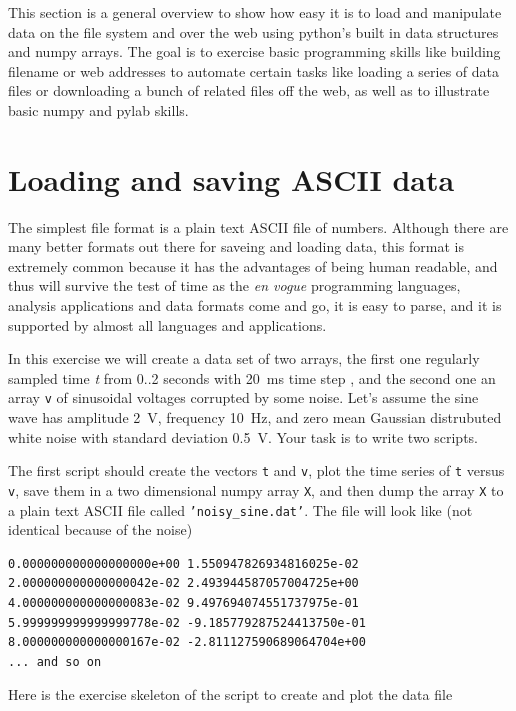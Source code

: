 This section is a general overview to show how easy it is to load
and manipulate data on the file system and over the web using python's
built in data structures and numpy arrays.  The goal is to exercise
basic programming skills like building filename or web addresses to
automate certain tasks like loading a series of data files or
downloading a bunch of related files off the web, as well as to
illustrate basic numpy and pylab skills.

\section{Loading and saving ASCII data}
\label{sec:ascii_data}

The simplest file format is a plain text ASCII file of numbers.
Although there are many better formats out there for saveing and
loading data, this format is extremely common because it has the
advantages of being human readable, and thus will survive the test of
time as the \textit{en vogue} programming languages, analysis
applications and data formats come and go, it is easy to parse, and it
is supported by almost all languages and applications.  

In this exercise we will create a data set of two arrays, the first
one regularly sampled time \textit{t} from 0..2 seconds with 20~ms
time step , and the second one an array \texttt{v} of sinusoidal
voltages corrupted by some noise.  Let's assume the sine wave has
amplitude 2~V, frequency 10~Hz, and zero mean Gaussian distrubuted
white noise with standard deviation 0.5~V.  Your task is to write two
scripts.

The first script should create the vectors \texttt{t} and \texttt{v},
plot the time series of \texttt{t} versus \texttt{v}, save them in a
two dimensional numpy array \texttt{X}, and then dump the array
\texttt{X} to a plain text ASCII file called
\texttt{'noisy\_sine.dat'}.  The file will look like (not identical
because of the noise)

\begin{verbatim}
0.000000000000000000e+00 1.550947826934816025e-02
2.000000000000000042e-02 2.493944587057004725e+00
4.000000000000000083e-02 9.497694074551737975e-01
5.999999999999999778e-02 -9.185779287524413750e-01
8.000000000000000167e-02 -2.811127590689064704e+00
... and so on
\end{verbatim}

Here is the exercise skeleton of the script to create and plot the
data file

